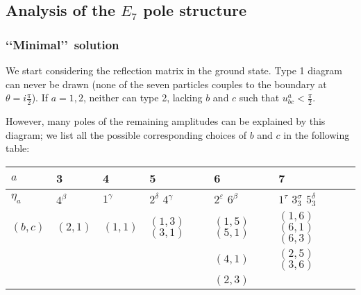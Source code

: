 \documentclass[a4paper,12pt]{report}
\begin{document}
\vspace{0.5cm}

\subsection{Analysis of the $E_{7}$ pole structure}

\subsubsection{\lq\lq Minimal\rq\rq \, solution}

We start considering the reflection matrix in the ground state. Type 1 diagram can never be drawn (none of the
seven particles couples to the boundary at $\theta=i\frac{\pi}{2}$). If $a=1,2$, neither can type 2, lacking $b$
and $c$ such that $u_{bc}^{a}<\frac{\pi}{2}$.

However, many poles of the remaining amplitudes can be explained by this diagram; we list all the possible
corresponding choices of $b$ and $c$ in the following table:

\begin{center}
\begin{tabular}{|l|l|l|l|l|l|}\hline
\hspace{1mm} $a$  & \hspace{2mm} 3 & \hspace{2mm} 4 & \hspace{9mm} 5 & \hspace{9mm} 6 & \hspace{1.5cm} 7 \\ \hline
\hspace{1mm} $\eta_{a}$ & \hspace{2mm} $4^{\beta}$ & \hspace{2mm} $1^{\gamma}$ &\hspace{2mm} $2^{\delta}$
\hspace{6mm} $4^{\gamma}$ &\hspace{2mm} $2^{\varepsilon}$ \hspace{6mm} $6^{\beta}$ &\hspace{2mm} $1^{\tau}$
\hspace{6mm} $3_{3}^{\sigma}$ \hspace{6mm} $5_{3}^{\delta}$ \\ \hline
 $(b,c)$ & $(2,1)$& $(1,1)$ & $(1,3)$ \hspace{1mm} $(3,1)$ & $(1,5)$ \hspace{1mm} $(5,1)$ & $(1,6)$ \hspace{1mm} $(6,1)$ \hspace{1mm} $(6,3)$ \\
         &        &         &                              & $(4,1)$                      & $(2,5)$ \hspace{1mm} $(3,6)$ \\
         &        &         &                              & $(2,3)$                      &                              \\ \hline
  \end{tabular}
\end{center}
\end{document}
